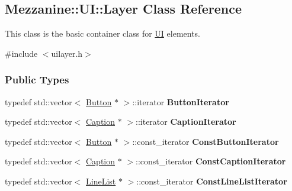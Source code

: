 \hypertarget{classMezzanine_1_1UI_1_1Layer}{
\subsection{Mezzanine::UI::Layer Class Reference}
\label{classMezzanine_1_1UI_1_1Layer}
}


This class is the basic container class for \hyperlink{namespaceMezzanine_1_1UI}{UI} elements.  




{\ttfamily \#include $<$uilayer.h$>$}

\subsubsection*{Public Types}
\begin{DoxyCompactItemize}
\item 
\hypertarget{classMezzanine_1_1UI_1_1Layer_a32af32baf0f30d77192eedecccc6135b}{
typedef std::vector$<$ \hyperlink{classMezzanine_1_1UI_1_1Button}{Button} $\ast$ $>$::iterator {\bfseries ButtonIterator}}
\label{classMezzanine_1_1UI_1_1Layer_a32af32baf0f30d77192eedecccc6135b}

\item 
\hypertarget{classMezzanine_1_1UI_1_1Layer_aa068f8487c3da86a4fb3fcf8e3a6e5cb}{
typedef std::vector$<$ \hyperlink{classMezzanine_1_1UI_1_1Caption}{Caption} $\ast$ $>$::iterator {\bfseries CaptionIterator}}
\label{classMezzanine_1_1UI_1_1Layer_aa068f8487c3da86a4fb3fcf8e3a6e5cb}

\item 
\hypertarget{classMezzanine_1_1UI_1_1Layer_acf57c7fd1886a77dc360da0702e642ea}{
typedef std::vector$<$ \hyperlink{classMezzanine_1_1UI_1_1Button}{Button} $\ast$ $>$::const\_\-iterator {\bfseries ConstButtonIterator}}
\label{classMezzanine_1_1UI_1_1Layer_acf57c7fd1886a77dc360da0702e642ea}

\item 
\hypertarget{classMezzanine_1_1UI_1_1Layer_a2094192a628a79e518238f717a1722ab}{
typedef std::vector$<$ \hyperlink{classMezzanine_1_1UI_1_1Caption}{Caption} $\ast$ $>$::const\_\-iterator {\bfseries ConstCaptionIterator}}
\label{classMezzanine_1_1UI_1_1Layer_a2094192a628a79e518238f717a1722ab}

\item 
\hypertarget{classMezzanine_1_1UI_1_1Layer_a3eb84aaaba8391813485879e3d2fc009}{
typedef std::vector$<$ \hyperlink{classMezzanine_1_1UI_1_1LineList}{LineList} $\ast$ $>$::const\_\-iterator {\bfseries ConstLineListIterator}}
\label{classMezzanine_1_1UI_1_1Layer_a3eb84aaaba8391813485879e3d2fc009}


\end{DoxyCompactItemize}
